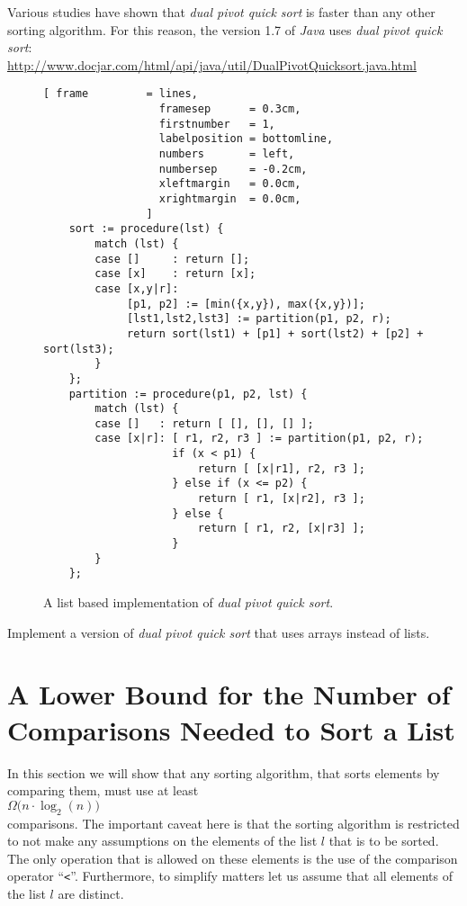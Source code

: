 \begin{enumerate}
      Various studies have shown that \emph{dual pivot quick sort} is faster than any other sorting
      algorithm.  For this reason, the version 1.7 of \textsl{Java} uses \emph{dual pivot quick sort}:
      \\[0.2cm]
      \hspace*{0.3cm}
      \href{http://www.docjar.com/html/api/java/util/DualPivotQuicksort.java.html}{http://www.docjar.com/html/api/java/util/DualPivotQuicksort.java.html} 
\end{enumerate}

\begin{figure}[!ht]
\centering
\begin{Verbatim}[ frame         = lines, 
                  framesep      = 0.3cm, 
                  firstnumber   = 1,
                  labelposition = bottomline,
                  numbers       = left,
                  numbersep     = -0.2cm,
                  xleftmargin   = 0.0cm,
                  xrightmargin  = 0.0cm,
                ]
    sort := procedure(lst) {
        match (lst) {
        case []     : return [];
        case [x]    : return [x];
        case [x,y|r]: 
             [p1, p2] := [min({x,y}), max({x,y})];
             [lst1,lst2,lst3] := partition(p1, p2, r);
             return sort(lst1) + [p1] + sort(lst2) + [p2] + sort(lst3);
        }
    };
    partition := procedure(p1, p2, lst) {
        match (lst) {
        case []   : return [ [], [], [] ];
        case [x|r]: [ r1, r2, r3 ] := partition(p1, p2, r);
                    if (x < p1) {
                        return [ [x|r1], r2, r3 ];
                    } else if (x <= p2) {
                        return [ r1, [x|r2], r3 ];
                    } else {
                        return [ r1, r2, [x|r3] ];
                    }
        }
    };
\end{Verbatim}
\vspace*{-0.3cm}
\caption{A list based implementation of \emph{dual pivot quick sort}.}
\label{fig:dual-pivot-quick-sort.stlx}
\end{figure}

\exercise
Implement a version of \emph{dual pivot quick sort} that uses arrays instead of lists.


\section[A Lower Bound]{A Lower Bound for the Number of Comparisons Needed to Sort a List}
In this section we will show that any sorting algorithm, that sorts elements by comparing them, must
use at least 
\\[0.2cm]
\hspace*{1.3cm}
 $\Omega\bigl(n \cdot \log_2(n)\bigr)$ 
\\[0.2cm]
comparisons.  The important caveat here is that the sorting algorithm is restricted to not make any assumptions
on the elements of the list $l$ that is to be sorted.  The only operation that is allowed on these
elements is the use of the comparison operator ``\texttt{<}''.  Furthermore, to simplify matters let
us assume that all elements of the list $l$ are distinct.

